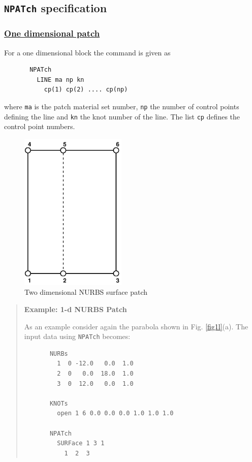 \subsection{\texttt{NPATch} specification}

\subsubsection{\ul{One dimensional patch}}

For a one dimensional block the command is given as
\begin{verbatim}
       NPATch
         LINE ma np kn
           cp(1) cp(2) .... cp(np)
\end{verbatim}
where \texttt{ma} is the patch material set number,
\texttt{np} the number of control points defining the line and \texttt{kn}
the knot number of the line.  The list \texttt{cp} defines the
control point numbers.

\begin{figure}[b!]
\begin{center}

\includegraphics[height=3in]{figs/nblock2d}

\caption{Two dimensional NURBS surface patch \label{fig2b} }
\end{center}
\end{figure}

\begin{quote}
\noindent
\textbf{Example: 1-d NURBS Patch}

As an example consider again the parabola shown in Fig. \ref{fig1l}(a). The input
data using \texttt{NPATch} becomes:
\begin{verbatim}
       NURBs
         1  0 -12.0   0.0  1.0
         2  0   0.0  18.0  1.0
         3  0  12.0   0.0  1.0

       KNOTs
         open 1 6 0.0 0.0 0.0 1.0 1.0 1.0

       NPATch
         SURFace 1 3 1
           1  2  3

\end{verbatim}
\end{quote}

